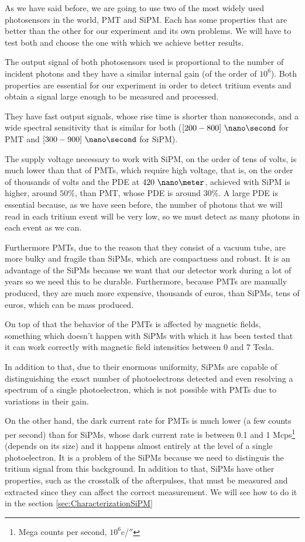 As we have said before, we are going to use two of the most widely used photosensors in the world, PMT and SiPM. Each has some properties that are better than the other for our experiment and its own problems. We will have to test both and choose the one with which we achieve better results.

The output signal of both photosensors used is proportional to the number of incident photons and they have a similar internal gain (of the order of $10^6$). Both properties are essential for our experiment in order to detect tritium events and obtain a signal large enough to be measured and processed. 

They have fast output signals, whose rise time is shorter than nanoseconds, and a wide spectral sensitivity that is similar for both ($[200-800]~\nano\second$ for PMT and $[300-900]~\nano\second$ for SiPM).

The supply voltage necessary to work with SiPM, on the order of tens of volts, is much lower than that of PMTs, which require high voltage, that is, on the order of thousands of volts and the PDE at $420~\nano\meter$,  achieved with SiPM is higher, around $50\%$, than PMT, whose PDE is around $30\%$. A large PDE is essential because, as we have seen before, the number of photons that we will read in each tritium event will be very low, so we must detect as many photons in each event as we can.

Furthermore PMTs, due to the reason that they consist of a vacuum tube, are more bulky and fragile than SiPMs, which are compactness and robust. It is an advantage of the SiPMs because we want that our detector work during a lot of years so we need this to be durable. Furthermore, because PMTs are manually produced, they are much more expensive, thousands of euros, than SiPMs, tens of euros, which can be mass produced.

On top of that the behavior of the PMTs is affected by magnetic fields, something which doesn't happen with SiPMs with which it has been tested that it can work correctly with magnetic field intensities between 0 and 7 Tesla. 

In addition to that, due to their enormous uniformity, SiPMs are capable of distinguishing the exact number of photoelectrons detected and even resolving a spectrum of a single photoelectron, which is not possible with PMTs due to variations in their gain.

On the other hand, the dark current rate for PMTs is much lower (a few counts per second) than for SiPMs, whose dark current rate is between 0.1 and 1 Mcps\footnote{Mega counts per second, $10^6$c/$\second$} (depends on its size) and it happens almost entirely at the level of a single photoelectron. It is a problem of the SiPMs because we need to distinguis the tritium signal from this background. In addition to that, SiPMs have other properties, such as the crosstalk of the afterpulses, that must be measured and extracted since they can affect the correct measurement. We will see how to do it in the section \ref{sec:CharacterizationSiPM}

